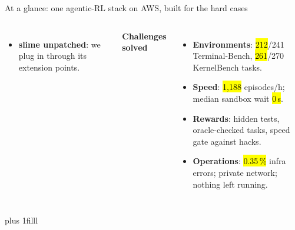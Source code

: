 \begin{frame}{At a glance: one agentic-RL stack on AWS, built for the hard cases}
\begin{columns}[T]
\begin{itemize}
\item \textbf{slime unpatched}: we plug in through its extension points.
\end{itemize}
\vspace{1mm}
{\normalsize\textbf{\textcolor{awsteal}{Challenges solved}}}
\begin{itemize}\footnotesize\setlength{\itemsep}{0.6mm}
\item \textbf{Environments}: \hl{212}/241 Terminal-Bench, \hl{261}/270 KernelBench tasks.
\item \textbf{Speed}: \hl{1{,}188} episodes/h; median sandbox wait \hl{0\,s}.
\item \textbf{Rewards}: hidden tests, oracle-checked tasks, speed gate against hacks.
\item \textbf{Operations}: \hl{0.35\,\%} infra errors; private network; nothing left running.
\end{itemize}
\end{columns}
\par\vskip 0pt plus 1filll
\end{frame}

